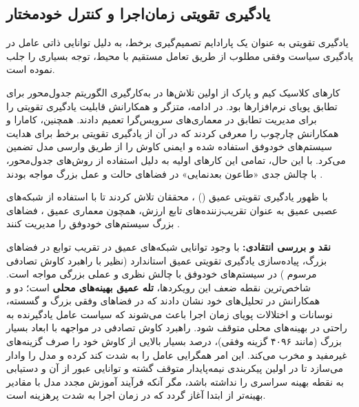 \documentclass[oneside,openany,phd]{TMU-Thesis}
\begin{document}
\subsection{یادگیری تقویتی زمان‌اجرا و کنترل خودمختار}
\label{sec:ch3_rl_adaptation}

یادگیری تقویتی به عنوان یک پارادایم تصمیم‌گیری برخط، به دلیل توانایی ذاتی عامل در یادگیری سیاست وفقی مطلوب از طریق تعامل مستقیم با محیط، توجه بسیاری را جلب نموده است. 

کارهای کلاسیک کیم و پارک \cite{kim2009reinforcement} از اولین تلاش‌ها در به‌کارگیری الگوریتم  جدول‌محور برای تطابق پویای نرم‌افزارها بود. در ادامه، متزگر و همکارانش \cite{metzger2022realizing} قابلیت یادگیری تقویتی را برای مدیریت تطابق در معماری‌های سرویس‌گرا تعمیم دادند. همچنین، کامارا و همکارانش \cite{camara2020quantitative} چارچوب  را معرفی کردند که در آن از یادگیری تقویتی برخط برای هدایت سیستم‌های خودوفق استفاده شده و ایمنی کاوش را از طریق وارسی مدل تضمین می‌کرد. با این حال، تمامی این کارهای اولیه به دلیل استفاده از روش‌های جدول‌محور، با چالش جدی «طاعون بعدنمایی» در فضاهای حالت و عمل بزرگ مواجه بودند \cite{sutton2018reinforcement}.

با ظهور یادگیری تقویتی عمیق () \cite{mnih2015human}، محققان تلاش کردند تا با استفاده از شبکه‌های عصبی عمیق به عنوان تقریب‌زننده‌های تابع ارزش، همچون معماری عمیق ، فضاهای بزرگ سیستم‌های خودوفق را مدیریت کنند \cite{du2023scalability}.

\textbf{نقد و بررسی انتقادی:}
با وجود توانایی شبکه‌های عمیق در تقریب توابع در فضاهای بزرگ، پیاده‌سازی یادگیری تقویتی عمیق استاندارد (نظیر  با راهبرد کاوش تصادفی مرسوم ) در سیستم‌های خودوفق با چالش نظری و عملی بزرگی مواجه است.
شاخص‌ترین نقطه ضعف این رویکردها، \textbf{تله عمیق بهینه‌های محلی} است؛ دو و همکارانش \cite{du2023scalability} در تحلیل‌های خود نشان دادند که در فضاهای وفقی بزرگ و گسسته، نوسانات و اختلالات پویای زمان اجرا باعث می‌شوند که سیاست عامل یادگیرنده به راحتی در بهینه‌های محلی متوقف شود. راهبرد کاوش تصادفی  در مواجهه با ابعاد بسیار بزرگ (مانند ۴۰۹۶ گزینه وفقی)، درصد بسیار بالایی از کاوش خود را صرف گزینه‌های غیرمفید و مخرب می‌کند. این امر همگرایی عامل را به شدت کند کرده و مدل را وادار می‌سازد تا در اولین پیکربندی نیمه‌پایدار متوقف گشته و توانایی عبور از آن و دستیابی به نقطه بهینه سراسری را نداشته باشد، مگر آنکه فرآیند آموزش مجدد مدل با مقادیر بهینه‌تر از ابتدا آغاز گردد که در زمان اجرا به شدت پرهزینه است.
\end{document}

